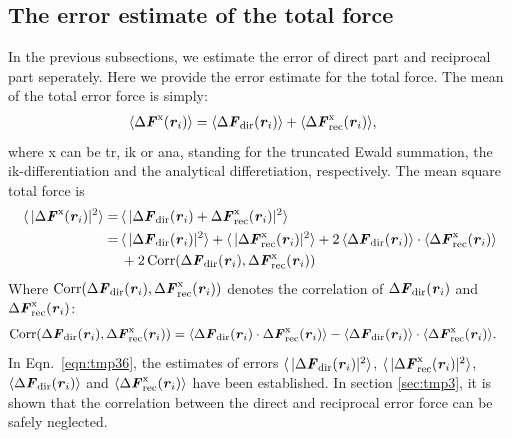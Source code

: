 \documentclass[aps,pre,preprint]{revtex4}
\renewcommand{\v}[1]{\textbf{\textit{#1}}}
\begin{document}
\subsection{The error estimate of the total force}

In the previous subsections, we estimate the error of direct part and
reciprocal part seperately. Here we provide the error estimate for the
total force. The mean of the total error force is simply:
\begin{align}
  \langle\Delta\v F^{\textrm{x}}(\v r_i) \rangle
  &=
  \langle\Delta\v F_{\textrm{dir}}(\v r_i) \rangle +
  \langle\Delta\v F^{\textrm{x}}_{\textrm{rec}}(\v r_i) \rangle,
\end{align}
where \textrm{x} can be \textrm{tr}, \textrm{ik} or \textrm{ana},
standing for the truncated Ewald summation, the ik-differentiation
and the analytical differetiation, respectively. The mean square
total force is
\begin{align}\nonumber
  \langle\,\vert\Delta\v F^{\textrm{x}}(\v r_i)\vert^2\rangle
  = \,&
  \langle\,\vert
  \Delta\v F_{\textrm{dir}}(\v r_i) + \Delta\v F^{\textrm{x}}_{\textrm{rec}}(\v r_i) 
  \vert^2 \rangle \\\nonumber
  = \,&
  \langle\,\vert\Delta\v F_{\textrm{dir}}(\v r_i)\vert^2\rangle +
  \langle\,\vert\Delta\v F^{\textrm{x}}_{\textrm{rec}}(\v r_i)\vert^2\rangle +
  2\,\langle\Delta\v F_{\textrm{dir}}(\v r_i)\rangle
  \cdot \langle\Delta\v F^{\textrm{x}}_{\textrm{rec}}(\v r_i)\rangle \\\label{eqn:tmp36}
  &
  + 2\,\textrm{Corr}(\Delta\v F_{\textrm{dir}}(\v r_i),
  \Delta\v F^{\textrm{x}}_{\textrm{rec}}(\v r_i))
\end{align}
Where $ \textrm{Corr}(\Delta\v F_{\textrm{dir}}(\v r_i), \Delta\v
F^{\textrm{x}}_{\textrm{rec}}(\v r_i))$ denotes the correlation of
$\Delta\v F_{\textrm{dir}}(\v r_i)$ and $\Delta\v
F^{\textrm{x}}_{\textrm{rec}}(\v r_i)$:
\begin{align}\label{eqn:tmp37}
  \textrm{Corr}(\Delta\v F_{\textrm{dir}}(\v r_i),
  \Delta\v F^{\textrm{x}}_{\textrm{rec}}(\v r_i))
  & =
  \langle
  \Delta\v F_{\textrm{dir}}(\v r_i)\cdot
  \Delta\v F^{\textrm{x}}_{\textrm{rec}}(\v r_i)
  \rangle -
  \langle
  \Delta\v F_{\textrm{dir}}(\v r_i)
  \rangle\cdot
  \langle
  \Delta\v F^{\textrm{x}}_{\textrm{rec}}(\v r_i)
  \rangle.
\end{align}
In Eqn.~\eqref{eqn:tmp36}, the estimates of errors
$\langle\,\vert\Delta\v F_{\textrm{dir}}(\v r_i)\vert^2\rangle $,
$\langle\,\vert\Delta\v F^{\textrm{x}}_{\textrm{rec}}(\v
r_i)\vert^2\rangle $, $\langle\Delta\v F_{\textrm{dir}}(\v
r_i)\rangle$ and $\langle\Delta\v F^{\textrm{x}}_{\textrm{rec}}(\v
r_i)\rangle $ have been established. In section \ref{sec:tmp3}, it is
shown that the correlation between the direct and reciprocal error
force can be safely neglected.
\end{document}
